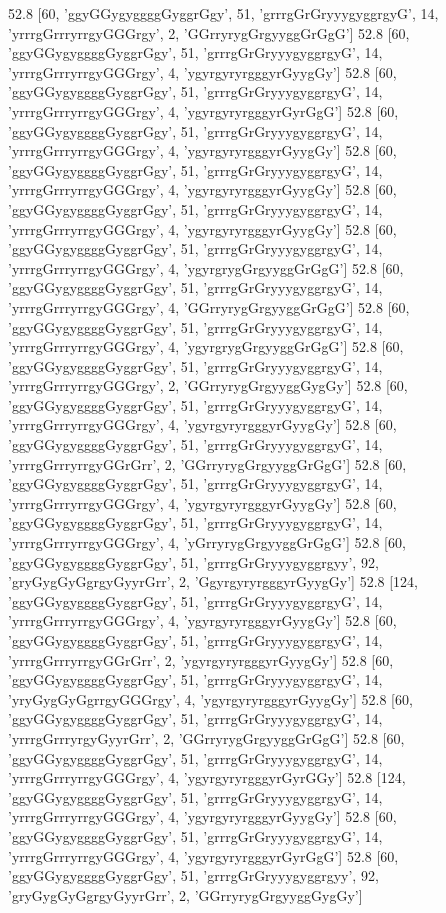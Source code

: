 52.8 [60, 'ggyGGygyggggGyggrGgy', 51, 'grrrgGrGryyygyggrgyG', 14, 'yrrrgGrrryrrgyGGGrgy', 2, 'GGrryrygGrgyyggGrGgG']
52.8 [60, 'ggyGGygyggggGyggrGgy', 51, 'grrrgGrGryyygyggrgyG', 14, 'yrrrgGrrryrrgyGGGrgy', 4, 'ygyrgyryrgggyrGyygGy']
52.8 [60, 'ggyGGygyggggGyggrGgy', 51, 'grrrgGrGryyygyggrgyG', 14, 'yrrrgGrrryrrgyGGGrgy', 4, 'ygyrgyryrgggyrGyrGgG']
52.8 [60, 'ggyGGygyggggGyggrGgy', 51, 'grrrgGrGryyygyggrgyG', 14, 'yrrrgGrrryrrgyGGGrgy', 4, 'ygyrgyryrgggyrGyygGy']
52.8 [60, 'ggyGGygyggggGyggrGgy', 51, 'grrrgGrGryyygyggrgyG', 14, 'yrrrgGrrryrrgyGGGrgy', 4, 'ygyrgyryrgggyrGyygGy']
52.8 [60, 'ggyGGygyggggGyggrGgy', 51, 'grrrgGrGryyygyggrgyG', 14, 'yrrrgGrrryrrgyGGGrgy', 4, 'ygyrgyryrgggyrGyygGy']
52.8 [60, 'ggyGGygyggggGyggrGgy', 51, 'grrrgGrGryyygyggrgyG', 14, 'yrrrgGrrryrrgyGGGrgy', 4, 'ygyrgrygGrgyyggGrGgG']
52.8 [60, 'ggyGGygyggggGyggrGgy', 51, 'grrrgGrGryyygyggrgyG', 14, 'yrrrgGrrryrrgyGGGrgy', 4, 'GGrryrygGrgyyggGrGgG']
52.8 [60, 'ggyGGygyggggGyggrGgy', 51, 'grrrgGrGryyygyggrgyG', 14, 'yrrrgGrrryrrgyGGGrgy', 4, 'ygyrgrygGrgyyggGrGgG']
52.8 [60, 'ggyGGygyggggGyggrGgy', 51, 'grrrgGrGryyygyggrgyG', 14, 'yrrrgGrrryrrgyGGGrgy', 2, 'GGrryrygGrgyyggGygGy']
52.8 [60, 'ggyGGygyggggGyggrGgy', 51, 'grrrgGrGryyygyggrgyG', 14, 'yrrrgGrrryrrgyGGGrgy', 4, 'ygyrgyryrgggyrGyygGy']
52.8 [60, 'ggyGGygyggggGyggrGgy', 51, 'grrrgGrGryyygyggrgyG', 14, 'yrrrgGrrryrrgyGGrGrr', 2, 'GGrryrygGrgyyggGrGgG']
52.8 [60, 'ggyGGygyggggGyggrGgy', 51, 'grrrgGrGryyygyggrgyG', 14, 'yrrrgGrrryrrgyGGGrgy', 4, 'ygyrgyryrgggyrGyygGy']
52.8 [60, 'ggyGGygyggggGyggrGgy', 51, 'grrrgGrGryyygyggrgyG', 14, 'yrrrgGrrryrrgyGGGrgy', 4, 'yGrryrygGrgyyggGrGgG']
52.8 [60, 'ggyGGygyggggGyggrGgy', 51, 'grrrgGrGryyygyggrgyy', 92, 'gryGygGyGgrgyGyyrGrr', 2, 'GgyrgyryrgggyrGyygGy']
52.8 [124, 'ggyGGygyggggGyggrGgy', 51, 'grrrgGrGryyygyggrgyG', 14, 'yrrrgGrrryrrgyGGGrgy', 4, 'ygyrgyryrgggyrGyygGy']
52.8 [60, 'ggyGGygyggggGyggrGgy', 51, 'grrrgGrGryyygyggrgyG', 14, 'yrrrgGrrryrrgyGGrGrr', 2, 'ygyrgyryrgggyrGyygGy']
52.8 [60, 'ggyGGygyggggGyggrGgy', 51, 'grrrgGrGryyygyggrgyG', 14, 'yryGygGyGgrrgyGGGrgy', 4, 'ygyrgyryrgggyrGyygGy']
52.8 [60, 'ggyGGygyggggGyggrGgy', 51, 'grrrgGrGryyygyggrgyG', 14, 'yrrrgGrrryrgyGyyrGrr', 2, 'GGrryrygGrgyyggGrGgG']
52.8 [60, 'ggyGGygyggggGyggrGgy', 51, 'grrrgGrGryyygyggrgyG', 14, 'yrrrgGrrryrrgyGGGrgy', 4, 'ygyrgyryrgggyrGyrGGy']
52.8 [124, 'ggyGGygyggggGyggrGgy', 51, 'grrrgGrGryyygyggrgyG', 14, 'yrrrgGrrryrrgyGGGrgy', 4, 'ygyrgyryrgggyrGyygGy']
52.8 [60, 'ggyGGygyggggGyggrGgy', 51, 'grrrgGrGryyygyggrgyG', 14, 'yrrrgGrrryrrgyGGGrgy', 4, 'ygyrgyryrgggyrGyrGgG']
52.8 [60, 'ggyGGygyggggGyggrGgy', 51, 'grrrgGrGryyygyggrgyy', 92, 'gryGygGyGgrgyGyyrGrr', 2, 'GGrryrygGrgyyggGygGy']
